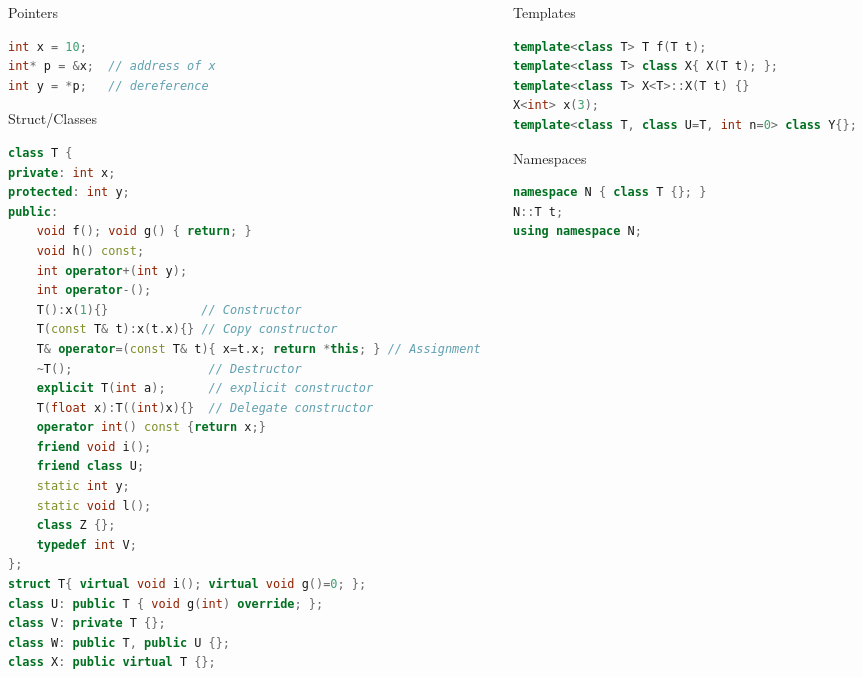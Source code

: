 \documentclass[final]{beamer}
\begin{document}
\begin{frame}[t,fragile]
\begin{columns}[t,totalwidth=0.95\paperwidth, colsep=0.05\paperwidth]
\begin{column}{0.3\paperwidth}
\begin{block}{Pointers}
\begin{lstlisting}[language=C++]
int x = 10;
int* p = &x;  // address of x
int y = *p;   // dereference
\end{lstlisting}
\end{block}


    

\begin{block}{Struct/Classes}
\begin{lstlisting}[language=C++]
class T {
private: int x;
protected: int y;
public:
    void f(); void g() { return; }
    void h() const;
    int operator+(int y);
    int operator-();
    T():x(1){}             // Constructor
    T(const T& t):x(t.x){} // Copy constructor
    T& operator=(const T& t){ x=t.x; return *this; } // Assignment
    ~T();                   // Destructor
    explicit T(int a);      // explicit constructor
    T(float x):T((int)x){}  // Delegate constructor
    operator int() const {return x;}
    friend void i();
    friend class U;
    static int y; 
    static void l();
    class Z {}; 
    typedef int V;
};
struct T{ virtual void i(); virtual void g()=0; }; 
class U: public T { void g(int) override; };
class V: private T {};
class W: public T, public U {};
class X: public virtual T {};
\end{lstlisting}
\end{block}

\end{column}
\begin{column}{0.3\paperwidth}


\begin{block}{Templates}
\begin{lstlisting}[language=C++]
template<class T> T f(T t);
template<class T> class X{ X(T t); };
template<class T> X<T>::X(T t) {}
X<int> x(3);
template<class T, class U=T, int n=0> class Y{};
\end{lstlisting}
\end{block}

\begin{block}{Namespaces}
\begin{lstlisting}[language=C++]
namespace N { class T {}; }
N::T t;
using namespace N;
\end{lstlisting}
\end{block}



\end{column}
\end{columns}
\end{frame}
\end{document}
